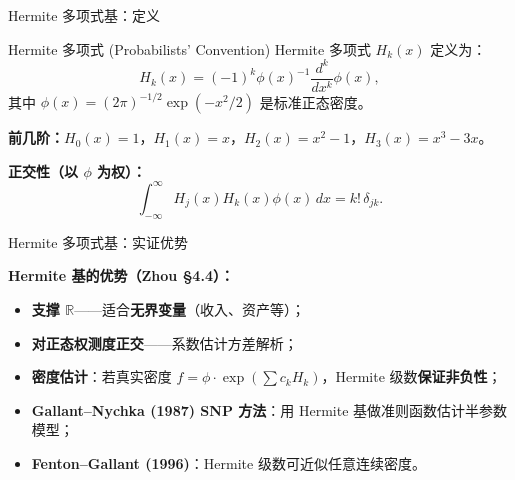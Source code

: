 \documentclass[aspectratio=169, 10pt]{beamer}
\begin{document}
\begin{frame}{Hermite 多项式基：定义}

  \begin{definitionbox}{Hermite 多项式 (Probabilists' Convention)}
    Hermite 多项式 $H_k(x)$ 定义为：
    \[
      H_k(x) = (-1)^k \phi(x)^{-1} \frac{d^k}{dx^k}\phi(x),
    \]
    其中 $\phi(x) = (2\pi)^{-1/2}\exp(-x^2/2)$ 是标准正态密度。

    \textbf{前几阶：}$H_0(x) = 1$，$H_1(x) = x$，$H_2(x) = x^2 - 1$，$H_3(x) = x^3 - 3x$。

    \textbf{正交性（以 $\phi$ 为权）：}
    \[
      \int_{-\infty}^{\infty} H_j(x) H_k(x) \phi(x)\, dx = k!\, \delta_{jk}.
    \]
  \end{definitionbox}

\end{frame}


\begin{frame}{Hermite 多项式基：实证优势}

  \begin{keybox}
    \textbf{Hermite 基的优势（Zhou §4.4）：}
    \begin{itemize}
      \item \textbf{支撑 $\mathbb{R}$}——适合\textbf{无界变量}（收入、资产等）；
      \item \textbf{对正态权测度正交}——系数估计方差解析；
      \item \textbf{密度估计}：若真实密度 $f = \phi \cdot \exp(\sum c_k H_k)$，Hermite 级数\textbf{保证非负性}；
      \item \textbf{Gallant--Nychka (1987) SNP 方法}：用 Hermite 基做准则函数估计半参数模型；
      \item \textbf{Fenton--Gallant (1996)}：Hermite 级数可近似任意连续密度。
    \end{itemize}
  \end{keybox}

\end{frame}
\end{document}
